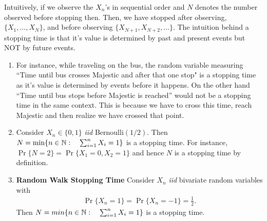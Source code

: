\documentclass[a4paper,10pt, english]{article}
\begin{document}
Intuitively, if we observe the $X_n$'s in sequential order and $N$ denotes the number observed before stopping then. Then, we have stopped after observing, $\{X_1, \ldots, X_N\}$, and before observing $\{X_{N+1}, X_{N+2}, \ldots\}$. 
The intuition behind a stopping time is that it's value is determined by past and present events but NOT by future events. 
\begin{shaded*}
\begin{enumerate}
\item For instance, while traveling on the bus, the random variable measuring ``Time until bus crosses Majestic and after that one stop" is a stopping time as it's value is determined by events before it happens. On the other hand ``Time until bus stops before Majestic is reached'' would not be a stopping time  in the same context. This is because we have to cross this time, reach Majestic and then realize we have crossed that point. 
\item Consider $X_n \in \{0,1\}$ \textit{iid} Bernoulli$(1/2)$. Then $N = \min \{n \in \mathbb{N}:\quad \sum_{i=1}^n X_i = 1\}$ is a stopping time. For instance, $\Pr\{N=2\} = \Pr\{X_1=0,X_2=1\}$ and hence $N$ is a stopping time by definition.
 \item \textbf{Random Walk Stopping Time} Consider $X_n$ \textit{iid} bivariate random variables with 
	\begin{align*}
	\Pr\{X_n = 1\} = \Pr\{X_n = -1\} = \frac{1}{2}. 
	\end{align*}
	Then $N = min \{n \in \mathbb{N}:\quad \sum_{i=1}^n X_i = 1\}$ is a stopping time.
\end{enumerate}
\end{shaded*}
\end{document}
